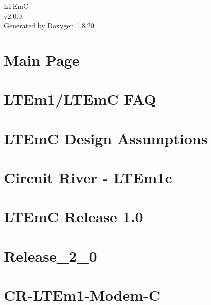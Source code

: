 \let\mypdfximage\pdfximage\def\pdfximage{\immediate\mypdfximage}\documentclass[twoside]{book}
\newcommand{\+}{\discretionary{\mbox{\scriptsize$\hookleftarrow$}}{}{}}
\newcommand{\clearemptydoublepage}{%
  \newpage{\pagestyle{empty}\cleardoublepage}%
}
\begin{document}
\hypersetup{pageanchor=false,
             bookmarksnumbered=true,
             pdfencoding=unicode
            }
\begin{titlepage}
\vspace*{7cm}
\begin{center}%
{\Large L\+T\+EmC \\[1ex]\large v2.\+0.\+0 }\\
\vspace*{1cm}
{\large Generated by Doxygen 1.8.20}\\
\end{center}
\end{titlepage}
\clearemptydoublepage
{}
\tableofcontents
\clearemptydoublepage
{}
\hypersetup{pageanchor=true}

\chapter{Main Page}
\label{index}\hypertarget{index}{}
\chapter{L\+T\+Em1/\+L\+T\+EmC F\+AQ}
\label{md__l_t_em1-_f_a_q}

\chapter{L\+T\+EmC Design Assumptions}
\label{md__l_t_em_c__design__assumptions}

\chapter{Circuit River -\/ L\+T\+Em1c}
\label{md__r_e_a_d_m_e}

\chapter{L\+T\+EmC Release 1.0}
\label{md__release_1_0}

\chapter{Release\+\_\+2\+\_\+0}
\label{md__release_2_0}

\chapter{C\+R-\/\+L\+T\+Em1-\/\+Modem-\/C}
\label{md_tests__l_t_em_c-1-platform__r_e_a_d_m_e}

\end{document}
